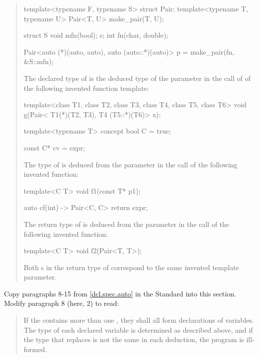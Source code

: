 \begin{quote}
\begin{addedblock}
\enterexample
\begin{codeblock}
template<typename F, typename S> struct Pair;
template<typename T, typename U> Pair<T, U> make_pair(T, U);

struct S { void mfn(bool); } s;
int fn(char, double);

Pair<auto (*)(auto, auto), auto (auto::*)(auto)> p = make_pair(fn, &S::mfn);
\end{codeblock}
The declared type of  is the deduced type of the parameter 
 in the call of  of the following 
invented function template:
\begin{codeblock}
template<class T1, class T2, class T3, class T4, class T5, class T6>
void g(Pair< T1(*)(T2, T3), T4 (T5::*)(T6)> x);
\end{codeblock}
\exitexample

\enterexample
\begin{codeblock}
template<typename T> concept bool C = true;

const C* cv = expr;
\end{codeblock}
The type of  is deduced from the parameter  in the
call  of the following invented function:
\begin{codeblock}
template<C T> void f1(const T* p1);
\end{codeblock}
\exitexample

\enterexample
\begin{codeblock}
auto cf(int) -> Pair<C, C> { return expr; }
\end{codeblock}
The return type of  is deduced from the parameter  in the
call  of the following invented function:
\begin{codeblock}
template<C T> void f2(Pair<T, T>);
\end{codeblock}
Both s in the return type of 
 correspond to the same invented template parameter.
\exitexample
\end{addedblock}
\end{quote}

Copy paragraphs 8-15 from \ref{dcl.spec.auto} in the \Cpp Standard into
this section. Modify paragraph 8 (here, 2) to read:

\begin{quote}
\pnum
If the  contains more than one 
, they shall all form declarations of variables.
The type of each declared variable is determined as described above, and if 
the type that replaces  
is not the same in each deduction, the program is ill-formed.
\end{quote}

